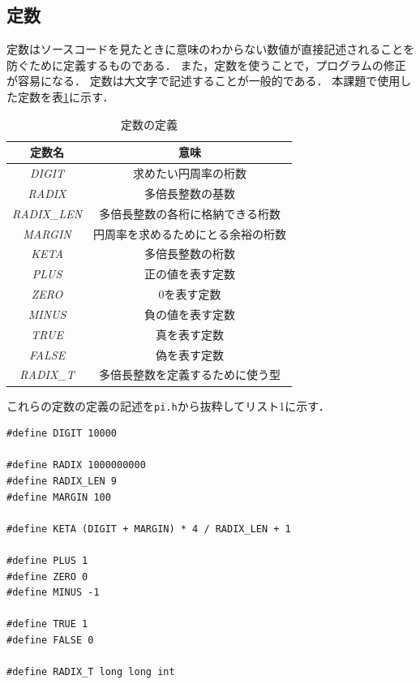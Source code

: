 \documentclass[a4paper,11pt,dvipdfmx]{jsarticle}
\begin{document}
\subsection{定数}
定数はソースコードを見たときに意味のわからない数値が直接記述されることを防ぐために定義するものである．
また，定数を使うことで，プログラムの修正が容易になる．
定数は大文字で記述することが一般的である．
本課題で使用した定数を表\ref{table:constant}に示す．

\begin{table}[H]
\centering
\caption{定数の定義}
\label{table:constant}
\begin{tabular}{c|c}
\hline
定数名    & 意味   \\
\hline
\hline
\textit{DIGIT}    & 求めたい円周率の桁数   \\
\hline
\textit{RADIX}    & 多倍長整数の基数   \\
\hline
\textit{RADIX\_LEN}    & 多倍長整数の各桁に格納できる桁数   \\
\hline
\textit{MARGIN}    & 円周率を求めるためにとる余裕の桁数   \\
\hline
\textit{KETA}    & 多倍長整数の桁数   \\
\hline
\textit{PLUS}    & 正の値を表す定数   \\
\hline
\textit{ZERO}    & 0を表す定数   \\
\hline
\textit{MINUS}    & 負の値を表す定数   \\
\hline
\textit{TRUE}    & 真を表す定数   \\
\hline
\textit{FALSE}    & 偽を表す定数   \\
\hline
\textit{RADIX\_T}    & 多倍長整数を定義するために使う型   \\
\hline
\end{tabular}
\end{table}

これらの定数の定義の記述を\texttt{pi.h}から抜粋してリスト1に示す．
\begin{lstlisting}[caption=定数の定義(\texttt{pi.h}から一部抜粋),label=lst:pi]
#define DIGIT 10000

#define RADIX 1000000000
#define RADIX_LEN 9
#define MARGIN 100

#define KETA (DIGIT + MARGIN) * 4 / RADIX_LEN + 1

#define PLUS 1
#define ZERO 0
#define MINUS -1

#define TRUE 1
#define FALSE 0

#define RADIX_T long long int
\end{lstlisting}
\end{document}
